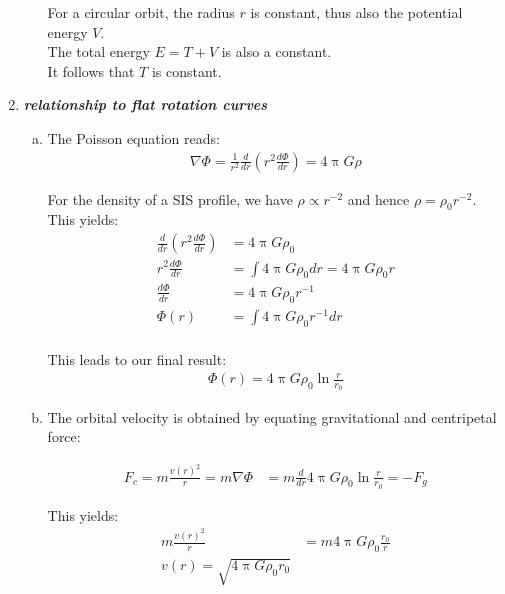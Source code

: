 \documentclass[a4paper,12pt]{article}
\newcommand{\question}[1]{\textbf{\textit{#1}}}
\renewcommand{\pi}{\uppi}
\begin{document}
\begin{enumerate}
\begin{enumerate}[(a)]
			For a circular orbit, the radius $r$ is constant, thus also the potential energy $V$.\\
			The total energy $E=T+V$ is also a constant.\\
			It follows that $T$ is constant.
		\end{enumerate}
		
		\setcounter{equation}{0}
		\item \question{relationship to flat rotation curves}
		\begin{enumerate}[(a)]
			\item The Poisson equation reads: \\
			
			\begin{align*}
			\nabla  \Phi = \frac{1}{r^2} \frac{d}{dr} (r^2 \frac{d\Phi}{dr}) = 4 \pi G \rho
			\end{align*}
			
			For the density of a SIS profile, we have $\rho \propto r^{-2}$ and hence $\rho = \rho_0 r^{-2}$.\\             
			This yields: \\
			\begin{align*}
			\frac{d}{dr} (r^2 \frac{d\Phi}{dr}) &= 4 \pi G \rho_0 \\
			r^2 \frac{d\Phi}{dr} &= \int 4 \pi G \rho_0 dr = 4 \pi G \rho_0 r \\
			\frac{d\Phi}{dr} &= 4 \pi G \rho_0 r^{-1} \\
			\Phi(r) &= \int 4 \pi G \rho_0 r^{-1} dr \\
			\end{align*}
			
			This leads to our final result: \\
			\begin{align*}
			\Phi(r) = 4 \pi G \rho_0 \ln \frac{r}{r_0}
			\end{align*}
			
			
			
			
			\item The orbital velocity is obtained by equating gravitational and centripetal force: 
			
			\begin{align*}
			F_c = m \frac{v(r)^2}{r} = m \nabla \Phi &= m \frac{d}{dr} 4 \pi G \rho_0 \ln \frac{r}{r_0} = - F_g
			\end{align*}
			
			This yields: 
			\begin{align*}
			m \frac{v(r)^2}{r} &= m 4 \pi G \rho_0 \frac{r_0}{r}\\
			v(r) = \sqrt{4 \pi G \rho_0 r_0} \\
			\end{align*}
			

\end{enumerate}
\end{enumerate}
\end{document}

